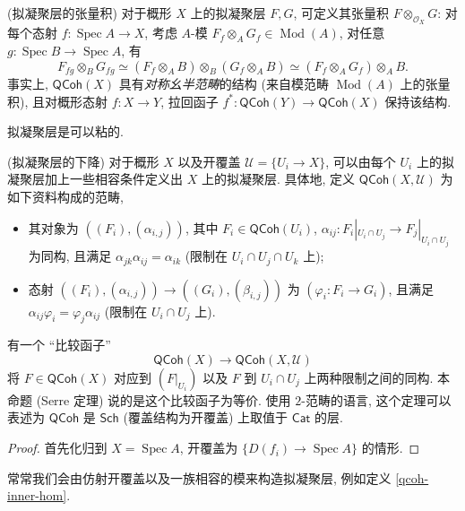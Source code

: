 \documentclass{book}
\begin{document}
	\begin{definition}
		[label={tensor-product-of-qcoh}]
		{(拟凝聚层的张量积)}
		对于概形 $X$ 上的拟凝聚层 $F,G$, 可定义其张量积 $F\otimes_{\mathcal O_X} G$:
		对每个态射 $f\colon\operatorname{Spec} A\to X$, 考虑 $A$-模 $F_f\otimes_{A}G_f\in\operatorname{Mod}(A)$, 对任意 $g\colon\operatorname{Spec} B\to\operatorname{Spec} A$, 有
		$$
		F_{fg}\otimes_BG_{fg}\simeq (F_f\otimes_A B)\otimes_B(G_f\otimes_A B)\simeq (F_f\otimes_A G_f) \otimes_A B.
		$$
		事实上, $\mathsf{QCoh}(X)$ 具有\emph{对称幺半范畴}的结构 (来自模范畴 $\operatorname{Mod}(A)$ 上的张量积), 且对概形态射 $f\colon X\to Y$, 拉回函子 $f^*\colon \mathsf{QCoh}(Y)\to\mathsf{QCoh}(X)$ 保持该结构.
	\end{definition}
	
	拟凝聚层是可以粘的.
	
	\begin{prop}
		{(拟凝聚层的下降)}
		对于概形 $X$ 以及开覆盖 $\mathcal  U = \{U_i \to X\}$, 可以由每个 $U_i$ 上的拟凝聚层加上一些相容条件定义出 $X$ 上的拟凝聚层. 具体地,
		定义 $\mathsf{QCoh}(X,\mathcal U)$ 为如下资料构成的范畴,
		\begin{itemize}
			\item 其对象为 $((F_i),(\alpha_{i,j}))$, 其中 $F_i\in\mathsf{QCoh}(U_i)$, $\alpha_{ij}\colon F_i|_{U_i\cap U_j}\to F_j|_{U_i\cap U_j}$ 为同构, 且满足 $\alpha_{jk}\alpha_{ij} = \alpha_{ik}$ (限制在 $U_i\cap U_j\cap U_k$ 上);
			\item 态射 $((F_i),(\alpha_{i,j})) \to ((G_i),(\beta_{i,j}))$ 为 $(\varphi_i\colon F_i\to G_i)$, 且满足 $\alpha_{ij}\varphi_i = \varphi_j\alpha_{ij}$ (限制在 $U_i\cap U_j$ 上).
		\end{itemize}
		有一个 ``比较函子''
		$$
		\mathsf{QCoh}(X) \to \mathsf{QCoh}(X,\mathcal U)
		$$
		将 $F\in\mathsf{QCoh}(X)$ 对应到 $(F|_{U_i})$ 以及 $F$ 到 $U_i\cap U_j$ 上两种限制之间的同构. 本命题 (Serre 定理) 说的是这个比较函子为等价.
		使用 $2$-范畴的语言, 这个定理可以表述为 $\mathsf{QCoh}$ 是 $\mathsf{Sch}$ (覆盖结构为开覆盖) 上取值于 $\mathsf{Cat}$ 的层.
	\end{prop}
	
	\begin{proof}
		首先化归到 $X=\operatorname{Spec} A$, 开覆盖为 $\{D(f_i)\to\operatorname{Spec} A\}$ 的情形.
	\end{proof}
	
	常常我们会由仿射开覆盖以及一族相容的模来构造拟凝聚层, 例如定义 \ref{qcoh-inner-hom}.
	
\end{document}
